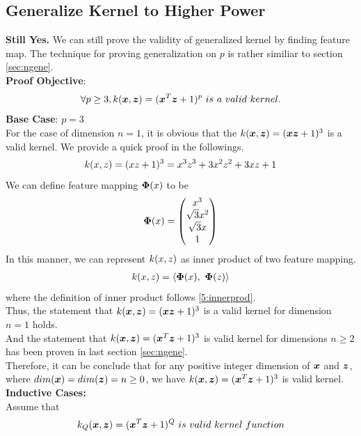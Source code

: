 \documentclass[11pt,a4paper]{article}
\newcommand{\htab}{\hspace*{0.63cm}}
\newcommand{\pg}{\\[0.3cm]}
\begin{document}
\subsection{Generalize Kernel to Higher Power}
\htab \textbf{Still Yes.} We can still prove the validity of generalized kernel by finding feature map. The technique for proving generalization on $p$ is rather similiar to section \ref{sec:ngene}.\pg
\htab \textbf{Proof Objective}:
    \begin{equation}
        \forall p \geq 3, k(\boldsymbol{x},\boldsymbol{z}) = (\boldsymbol{x}^{T}\boldsymbol{z} + 1)^{p}\ is\ a\ valid\ kernel.
    \end{equation}
\htab \textbf{Base Case}: $p = 3$ \\
\htab  For the case of dimension $n=1$, it is obvious that the $k(\boldsymbol{x},\boldsymbol{z}) = (\boldsymbol{x}\boldsymbol{z} + 1)^{3}$ 
is a valid kernel. We provide a quick proof in the followings.
\begin{align}
    k(x,z) = (xz + 1)^{3} =  x^{3}z^{3} + 3x^{2}z^{2} + 3xz + 1
    \end{align}
    \htab We can define feature mapping $\boldsymbol{\Phi}(x)$ to be
\begin{align}
    \boldsymbol{\Phi}(x) = \begin{pmatrix}
        x^{3} \\ \sqrt{3}x^{2} \\ \sqrt{3}x \\ 1
        \end{pmatrix}
    \end{align}
\htab In this manner, we can represent $k(x,z)$ as inner product of two feature mapping.
\begin{align}
    k(x,z) = \langle \boldsymbol{\Phi}(x) ,\ \boldsymbol{\Phi}(z) \rangle
    \end{align}
\htab where the definition of inner product follows \eqref{5:innerprod}. \\
\htab Thus, the statement that $k(\boldsymbol{x},\boldsymbol{z}) = (\boldsymbol{x}\boldsymbol{z} + 1)^{3}$ is a valid kernel for dimension $n = 1$ holds. \pg
\htab And the statement that $k(\boldsymbol{x},\boldsymbol{z}) = (\boldsymbol{x}^{T}\boldsymbol{z} + 1)^{3}$ is valid kernel for 
dimensions $n\geq2$ has been proven in last section \ref{sec:ngene}. \\
\htab Therefore, it can be conclude that for any positive integer dimension of $\boldsymbol{x}$ and $\boldsymbol{z}$, where
$dim(\boldsymbol{x}) = dim(\boldsymbol{z}) = n \geq 0 $, we have $k(\boldsymbol{x},\boldsymbol{z}) = (\boldsymbol{x}^{T}\boldsymbol{z} + 1)^{3}$ is valid kernel. \pg
\htab \textbf{Inductive Cases:} \\
\htab Assume that 
    \begin{align} \label{5:assumption2}
        k_{Q}(\boldsymbol{x},\boldsymbol{z}) = (\boldsymbol{x}^{T}\boldsymbol{z} + 1)^{Q}\ is\ valid\ kernel\ function
    \end{align}
\end{document}

